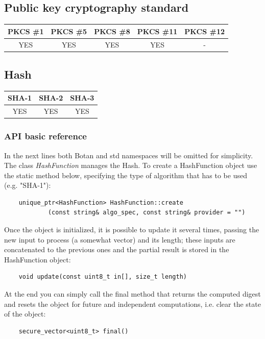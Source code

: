 \newpage
\subsection{Public key cryptography standard}
\begin{table}[!ht]
	\begin{tabular}{|| c | c | c | c | c ||}
		\textbf{PKCS \#1} & \textbf{PKCS \#5} & \textbf{PKCS \#8}  & \textbf{PKCS \#11} & \textbf{PKCS \#12} \\
		\hline \hline
		YES & YES & YES & YES & - \\
	\end{tabular}
\end{table}

\subsection{Hash}
\begin{table}[!ht]
	\begin{tabular}{|| c | c | c ||}
		\textbf{SHA-1} & \textbf{SHA-2} & \textbf{SHA-3} \\
		\hline \hline
		YES & YES & YES \\
	\end{tabular}
\end{table}

\subsubsection*{API basic reference}
In the next lines both Botan and std namespaces will be omitted for simplicity. The class \textit{HashFunction} manages the Hash. To create a HashFunction object use the static method below, specifying the type of algorithm that has to be used (e.g. "SHA-1"): 
\begin{verbatim}
    unique_ptr<HashFunction> HashFunction::create
            (const string& algo_spec, const string& provider = "")	
\end{verbatim}
Once the object is initialized, it is possible to update it several times, passing the new input to process (a somewhat vector) and its length; these inputs are concatenated to the previous ones and the partial result is stored in the HashFunction object:
\begin{verbatim}
    void update(const uint8_t in[], size_t length)
\end{verbatim}
At the end you can simply call the final method that returns the computed digest and resets the object for future and independent computations, i.e. clear the state of the object:
\begin{verbatim}
    secure_vector<uint8_t> final()
\end{verbatim}

